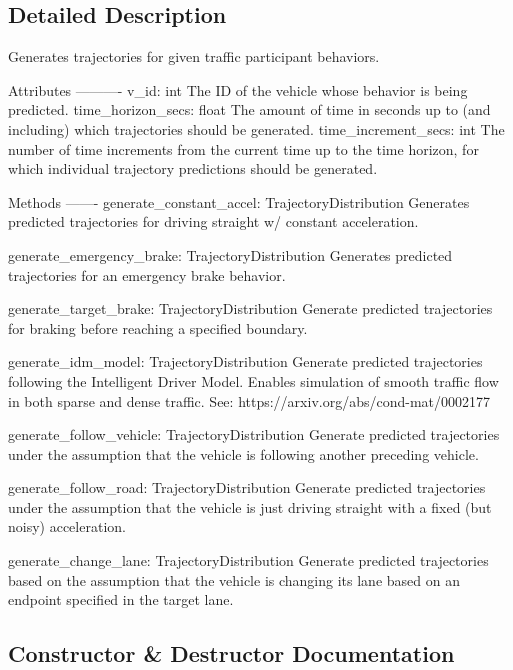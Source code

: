 \subsection{Detailed Description}
\begin{DoxyVerb}Generates trajectories for given traffic participant behaviors.

Attributes
----------
v_id: int
    The ID of the vehicle whose behavior is being predicted.
time_horizon_secs: float
    The amount of time in seconds up to (and including) which trajectories should be generated.
time_increment_secs: int
    The number of time increments from the current time up to the time horizon,
    for which individual trajectory predictions should be generated.

Methods
-------
generate_constant_accel: TrajectoryDistribution
    Generates predicted trajectories for driving straight w/ constant acceleration.

generate_emergency_brake: TrajectoryDistribution
    Generates predicted trajectories for an emergency brake behavior.

generate_target_brake: TrajectoryDistribution
    Generate predicted trajectories for braking before reaching a specified boundary.

generate_idm_model: TrajectoryDistribution
    Generate predicted trajectories following the Intelligent Driver Model.
    Enables simulation of smooth traffic flow in both sparse and dense traffic.
    See: https://arxiv.org/abs/cond-mat/0002177

generate_follow_vehicle: TrajectoryDistribution
    Generate predicted trajectories under the assumption that the vehicle 
    is following another preceding vehicle.

generate_follow_road: TrajectoryDistribution
    Generate predicted trajectories under the assumption that the vehicle
    is just driving straight with a fixed (but noisy) acceleration.

generate_change_lane: TrajectoryDistribution
    Generate predicted trajectories based on the assumption that
    the vehicle is changing its lane based on an endpoint specified
    in the target lane.\end{DoxyVerb}
 

\subsection{Constructor \& Destructor Documentation}
\mbox{\label{classimplementation_1_1oo__realization_1_1trajectory__generation_1_1_trajectory_generator_ad3ad3798257f669909694f156b6ecab7}} 
